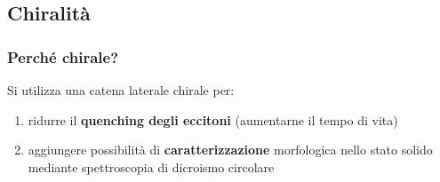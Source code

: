 \documentclass{beamer}
\begin{document}
\subsection{Chiralità}
\begin{frame}%
\frametitle{Perché chirale?}
Si utilizza una catena laterale chirale per:

\begin{enumerate} 
\item ridurre il \textbf{quenching degli eccitoni} (aumentarne il tempo di vita)

\item aggiungere possibilità di \textbf{caratterizzazione} morfologica nello stato solido mediante spettroscopia di dicroismo circolare
\end{enumerate}
\end{frame}
\end{document}
